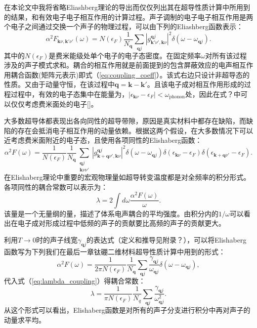 \documentclass[phd,nobackinfo]{scutthesis}
\begin{document}
在本论文中我将省略Eliashberg理论的导出而仅仅列出其在超导性质计算中所用到的结果，和有效电子电子相互作用的计算过程。声子调制的电子电子相互作用是两个电子之间通过交换一个声子的物理过程，可以由下列的Eliashberg函数表示：
\begin{equation}
  \alpha^2 F_{\bm{k}\nu,\bm{k}'\nu'}(\omega) =
  N(\epsilon_F) \frac{1}{N_{\bm{q}}} \sum_{\bm{q}j}
  |g^{\bm{q}j}_{\bm{k}'\nu',\bm{k}\nu}|^2 \delta(\omega-\omega_{\bm{q}j}).
\end{equation}
其中的$N(\epsilon_F)$是费米能级处单个电子的电子态密度。在固定频率$\omega$对所有该过程涉及的声子模式求和。耦合的相互作用就是前面提到的包含屏蔽效应的电声相互作用耦合函数(矩阵元表示)即式（\ref{eq:coupling_coeff}）。该式右边只设计非超导态的性质。又由于动量守恒，在该过程中$\bm{q}=\bm{k}-\bm{k}'$。且该电子成对相互作用形成的过程过程中，有效的电子态集中在能量为，$|\epsilon_{\bm{k}\nu}-\epsilon_F|<\omega_{\mathrm{phonon}}$处，因此在式？中可以仅仅考虑费米面处的电子[]。

大多数超导体都表现出各向同性的超导带隙，原因是真实材料中都存在缺陷，而缺陷的存在会抵消电子相互作用的动量依赖。根据这两个假设，在大多数情况下可以近考虑费米面附近的电子态，且使用各项同性的Elishaberg函数：
\begin{equation}\label{eq:elishaberg_iso}
  \alpha^2 F(\omega) = \frac{1}{N(\epsilon_F)}\frac{1}{N_{\bm{q}}}
  \sum_{\substack{\bm{q}j \\ \bm{k}\nu\nu'}} |g^{\bm{q}j}_{\bm{k}+\bm{q}\nu',\bm{k}\nu}|^2
  \delta(\omega-\omega_{\bm{q}j})
  \delta(\epsilon_{\bm{k}\nu}-\epsilon_{F})
  \delta(\epsilon_{\bm{k}+\bm{q}\nu'}-\epsilon_F).
\end{equation}
在Elishaberg理论中重要的宏观物理量如超导转变温度都是对全频率的积分形式。各项同性的耦合常数可以表示为：
\begin{equation}\label{eq:lambda_coupling}
  \lambda = 2 \int d\omega \frac{\alpha^2 F(\omega)}{\omega}.
\end{equation}
该量是一个无量纲的量，描述了体系电声耦合的平均强度。由积分内的$1/\omega$可以看出在电子成对形成过程中低频的声子的贡献要比高频的声子的贡献更大。

利用$T\rightarrow 0$时的声子线宽$\gamma_{\bm{q}j}$的表达式（定义和推导见附录？），可以将Elishaberg函数写为下列我们在最后一章钛硼二维材料超导性质计算中用到的形式：
\begin{equation}\label{eq:elishaberg_calc}
  \alpha^2 F(\omega) = \frac{1}{2\pi N(\epsilon_F)}\frac{1}{N_{\bm{q}}}
  \sum_{\bm{q}j} \frac{\gamma_{\bm{q}j}}{\omega_{\bm{q}j}}
  \delta(\omega-\omega_{\bm{q}j}),
\end{equation}
代入式（\ref{eq:lambda_coupling}）得耦合常数：
\begin{equation}
  \lambda = \frac{1}{\pi N(\epsilon_F)}\frac{1}{N_q}
  \sum_{\bm{q}j}\frac{\gamma_{\bm{q}j}}{\omega^2_{\bm{q}j}}.
\end{equation}
从这个形式可以看出，Elishaberg函数是对所有的声子分支进行积分中再对声子的动量求平均。
\end{document}
